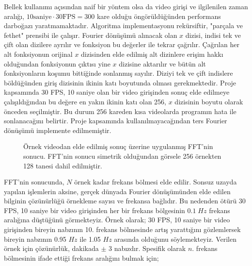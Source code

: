 \documentclass[a4paper, 12pt]{article}
\begin{document}
Bellek kullanımı açısından naif bir yöntem olsa da video girişi ve ilgilenilen zaman aralığı, $10\text{saniye}\cdot30\text{FPS}=300$ kare olduğu öngörüldüğünden performans darboğazı yaratmamaktadır. Algoritma implementasyonu rekürsiftir, "parçala ve fethet" prensibi ile çalışır. Fourier dönüşümü alınacak olan $x$ dizisi, indisi tek ve çift olan dizilere ayrılır ve fonksiyon bu değerler ile tekrar çağrılır. Çağrılan her alt fonksiyonun orijinal $x$ dizisinden elde edilmiş alt dizinlere erişim hakkı olduğundan fonksiyonun çıktısı yine $x$ dizisine aktarılır ve bütün alt fonksiyonların koşumu bittiğinde sonlanmış sayılır. Diziyi tek ve çift indislere böldüğünden giriş dizisinin ikinin katı boyutunda olması gerekmektedir. Proje kapsamında 30 FPS, 10 saniye olan bir video girişinden sonuç elde edilmeye çalışıldığından bu değere en yakın ikinin katı olan 256, $x$ dizisinin boyutu olarak önceden seçilmiştir. Bu durum 256 kareden kısa videolarda programın hata ile sonlanacağını belirtir. Proje kapsamında kullanılmayacağından ters Fourier dönüşümü implemente edilmemiştir. 

\begin{figure}[h]
\centering
{}
\caption{Örnek videodan elde edilmiş sonuç üzerine uygulanmış FFT'nin sonucu. FFT'nin sonucu simetrik olduğundan görsele 256 örnekten 128 tanesi dahil edilmiştir. } 
\label{ftt-sonuc}
\end{figure}


FFT'nin sonucunda, $N$ örnek kadar frekans bölmesi elde edilir. Sonsuz uzayda yapılan işlemlerin aksine, gerçek dünyada Fourier dönüşümünden elde edilen bilginin çözünürlüğü örnekleme sayısı ve frekansa bağlıdır. Bu nedenden ötürü 30 FPS, 10 saniye bir video girişinden her bir frekans bölgesinin $0.1 \; Hz$ frekans aralığına düştüğünü görmekteyiz. Örnek olarak; 30 FPS, 10 saniye bir video girişinden bireyin nabzının 10. frekans bölmesinde artış yarattığını gözlemlersek bireyin nabzının 0.95 $Hz$ ile 1.05 $Hz$ arasında olduğunu söylemekteyiz. Verilen örnek için çözünürlük, dakikada $\pm$ 3 nabızdır. Spesifik olarak $n.$ frekans bölmesinin ifade ettiği frekans aralığını bulmak için;
\end{document}
